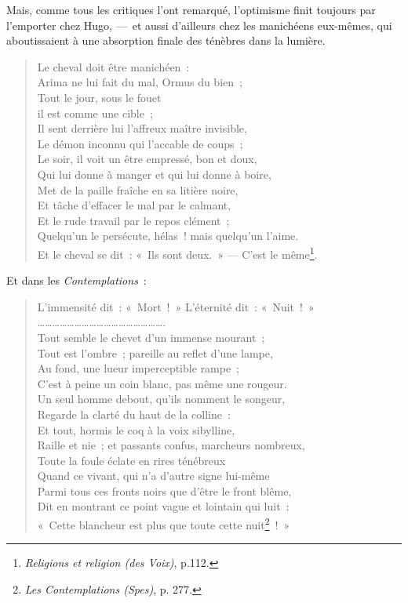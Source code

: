\documentclass[french,twoside]{book} %
\begin{document}
\noindent Mais, comme tous les critiques l’ont remarqué, l’optimisme finit toujours par l’emporter chez Hugo, — et aussi d’ailleurs chez les manichéens eux-mêmes, qui aboutissaient à une absorption finale des ténèbres dans la lumière.\par


\begin{verse}
Le cheval doit être manichéen :\\
Arima ne lui fait du mal, Ormus du bien ;\\
Tout le jour, sous le fouet\\
il est comme une cible ;\\
Il sent derrière lui l’affreux maître invisible,\\
Le démon inconnu qui l’accable de coups ;\\
Le soir, il voit un être empressé, bon et doux,\\
Qui lui donne à manger et qui lui donne à boire,\\
Met de la paille fraîche en sa litière noire,\\
Et tâche d’effacer le mal par le calmant,\\
Et le rude travail par le repos clément ;\\
Quelqu’un le persécute, hélas ! mais quelqu’un l’aime.\\
Et le cheval se dit : « Ils sont deux. » — C’est le même\footnote{\emph{Religions et religion (des Voix)}, p.112.}.\\
\end{verse}

\noindent Et dans les \emph{Contemplations} :\par


\begin{verse}
L’immensité dit : « Mort ! » L’éternité dit : « Nuit ! »\\
…………………………………………….\\
Tout semble le chevet d’un immense mourant ;\\
Tout est l’ombre ; pareille au reflet d’une lampe,\\
Au fond, une lueur imperceptible rampe ;\\
C’est à peine un coin blanc, pas même une rougeur.\\
Un seul homme debout, qu’ils nomment le songeur,\\
Regarde la clarté du haut de la colline :\\
Et tout, hormis le coq à la voix sibylline,\\
Raille et nie ; et passants confus, marcheurs nombreux,\\
Toute la foule éclate en rires ténébreux\\
Quand ce vivant, qui n’a d’autre signe lui-même\\
Parmi tous ces fronts noirs que d’être le front blême,\\
Dit en montrant ce point vague et lointain qui luit :\\
« Cette blancheur est plus que toute cette nuit\footnote{\emph{Les Contemplations (Spes)}, p. 277.} ! »\\
\end{verse}
\end{document}
